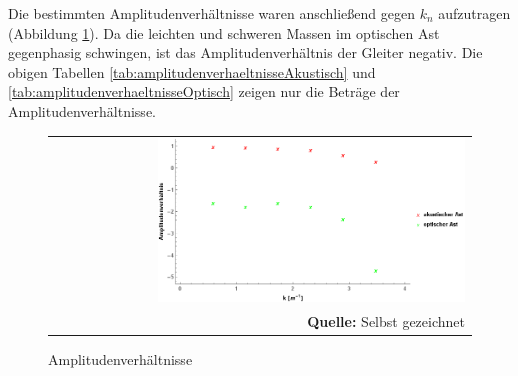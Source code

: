 \documentclass[a4paper,titlepage]{scrartcl}
\numberwithin{equation}{section}
\begin{document}
Die bestimmten Amplitudenverhältnisse waren anschließend gegen $k_n$ aufzutragen (Abbildung \ref{fig:amplitudenverhaeltnisse}). Da die leichten und schweren Massen im optischen Ast gegenphasig schwingen, ist das Amplitudenverhältnis der Gleiter negativ. Die obigen Tabellen \ref{tab:amplitudenverhaeltnisseAkustisch} und \ref{tab:amplitudenverhaeltnisseOptisch} zeigen nur die Beträge der Amplitudenverhältnisse.
\begin{figure}[H]
	\centering
	\begin{tabular}{@{}r@{}}
		\includegraphics[width=0.75\textwidth]{images/amplitudenverhaeltnis.png}\\
		\footnotesize\sffamily\textbf{Quelle:} Selbst gezeichnet
	\end{tabular}
	\caption{Amplitudenverhältnisse}
    \label{fig:amplitudenverhaeltnisse}
\end{figure}
\end{document}
